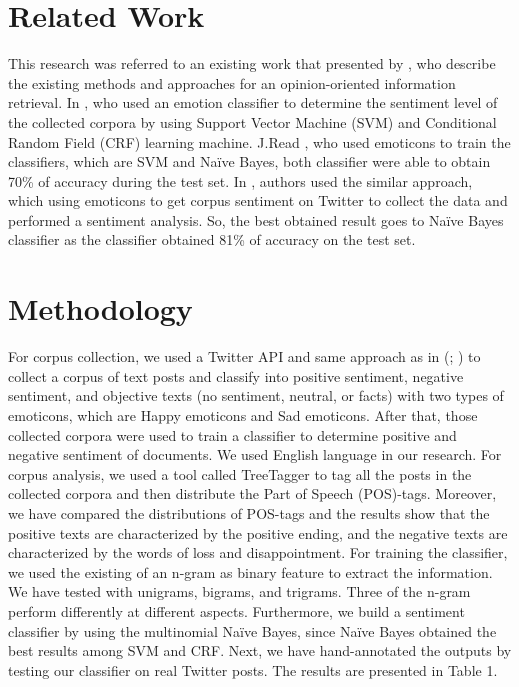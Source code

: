 \documentclass[a4paper,12pt]{article}
\begin{document}
\section*{\textbf{Related Work}}
This research was referred to an existing work that presented by \cite{pang2008opinion}, who describe the existing methods and approaches for an opinion-oriented information retrieval. In \cite{yang2007emotion}, who used an emotion classifier to determine the sentiment level of the collected corpora by using Support Vector Machine (SVM) and Conditional Random Field (CRF) learning machine. J.Read \cite{read2005using}, who used emoticons to train the classifiers, which are SVM and Naïve Bayes, both classifier were able to obtain 70\% of accuracy during the test set. In \cite{go2009twitter}, authors used the similar approach, which using emoticons to get corpus sentiment on Twitter to collect the data and performed a sentiment analysis. So, the best obtained result goes to Naïve Bayes classifier as the classifier obtained 81\% of accuracy on the test set.

\section*{\textbf{Methodology}}
For corpus collection, we used a Twitter API and same approach as in (\cite{read2005using}; \cite{go2009twitter}) to collect a corpus of text posts and classify into positive sentiment, negative sentiment, and objective texts (no sentiment, neutral, or facts) with two types of emoticons, which are Happy emoticons and Sad emoticons. After that, those collected corpora were used to train a classifier to determine positive and negative sentiment of documents. We used English language in our research. 
For corpus analysis, we used a tool called TreeTagger \cite{schmid1994probabilistic} to tag all the posts in the collected corpora and then distribute the Part of Speech (POS)-tags. Moreover, we have compared the distributions of POS-tags and the results show that the positive texts are characterized by the positive ending, and the negative texts are characterized by the words of loss and disappointment.
For training the classifier, we used the existing of an n-gram as binary feature to extract the information. We have tested with unigrams, bigrams, and trigrams. Three of the n-gram perform differently at different aspects. Furthermore, we build a sentiment classifier by using the multinomial Naïve Bayes, since Naïve Bayes obtained the best results among SVM and CRF. Next, we have hand-annotated the outputs by testing our classifier on real Twitter posts. The results are presented in Table 1.
\end{document}
